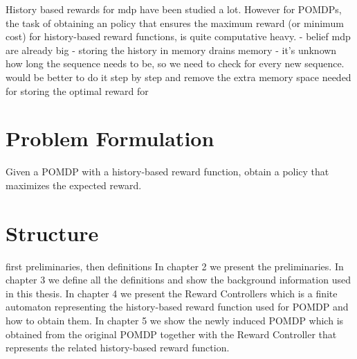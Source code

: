 History based rewards for mdp have been studied a lot. 
However for POMDPs, the task of obtaining an policy that ensures the maximum reward (or minimum cost) for history-based reward functions, is quite computative heavy. 
- belief mdp are already big
- storing the history in memory drains memory
- it's unknown how long the sequence needs to be, so we need to check for every new sequence. 
would be better to do it step by step and remove the extra memory space needed for storing the optimal reward for 


\section*{Problem Formulation}
Given a POMDP with a history-based reward function, obtain a policy that maximizes the expected reward.


\section*{Structure}
first preliminaries, then definitions 
In chapter 2 we present the preliminaries. In chapter 3 we define all the definitions and show the background information used in this thesis.
In chapter 4 we present the Reward Controllers which is a finite automaton representing the history-based reward function used for POMDP and how to obtain them. In chapter 5 we show the newly induced POMDP which is obtained from the original POMDP together with the Reward Controller that represents the related history-based reward function. 